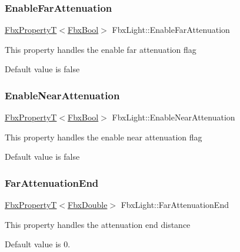 \subsubsection{\texorpdfstring{Enable\+Far\+Attenuation}{EnableFarAttenuation}}
{\footnotesize\ttfamily \hyperlink{class_fbx_property_t}{Fbx\+PropertyT}$<$\hyperlink{fbxtypes_8h_a92e0562b2fe33e76a242f498b362262e}{Fbx\+Bool}$>$ Fbx\+Light\+::\+Enable\+Far\+Attenuation}

This property handles the enable far attenuation flag

Default value is false \mbox{\label{class_fbx_light_ae9bf8b3fa56b50962615f78e999f3371}} 
\subsubsection{\texorpdfstring{Enable\+Near\+Attenuation}{EnableNearAttenuation}}
{\footnotesize\ttfamily \hyperlink{class_fbx_property_t}{Fbx\+PropertyT}$<$\hyperlink{fbxtypes_8h_a92e0562b2fe33e76a242f498b362262e}{Fbx\+Bool}$>$ Fbx\+Light\+::\+Enable\+Near\+Attenuation}

This property handles the enable near attenuation flag

Default value is false \mbox{\label{class_fbx_light_a2bb8f1a2eaba27196db363efe4cae050}} 
\subsubsection{\texorpdfstring{Far\+Attenuation\+End}{FarAttenuationEnd}}
{\footnotesize\ttfamily \hyperlink{class_fbx_property_t}{Fbx\+PropertyT}$<$\hyperlink{fbxtypes_8h_a171e72a1c46fc15c1a6c9c31948c1c5b}{Fbx\+Double}$>$ Fbx\+Light\+::\+Far\+Attenuation\+End}

This property handles the attenuation end distance

Default value is 0. \mbox{\label{class_fbx_light_ac28fb5441eded0c0cf73d1e3efcf92bc}} 
